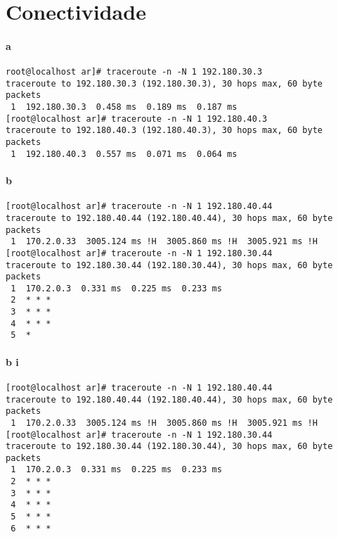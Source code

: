 \section{Conectividade}
\paragraph{a}
\begin{verbatim}
root@localhost ar]# traceroute -n -N 1 192.180.30.3
traceroute to 192.180.30.3 (192.180.30.3), 30 hops max, 60 byte packets
 1  192.180.30.3  0.458 ms  0.189 ms  0.187 ms
[root@localhost ar]# traceroute -n -N 1 192.180.40.3
traceroute to 192.180.40.3 (192.180.40.3), 30 hops max, 60 byte packets
 1  192.180.40.3  0.557 ms  0.071 ms  0.064 ms
\end{verbatim}

\paragraph{b}
\begin{verbatim}
[root@localhost ar]# traceroute -n -N 1 192.180.40.44                    
traceroute to 192.180.40.44 (192.180.40.44), 30 hops max, 60 byte packets
 1  170.2.0.33  3005.124 ms !H  3005.860 ms !H  3005.921 ms !H           
[root@localhost ar]# traceroute -n -N 1 192.180.30.44                    
traceroute to 192.180.30.44 (192.180.30.44), 30 hops max, 60 byte packets
 1  170.2.0.3  0.331 ms  0.225 ms  0.233 ms                              
 2  * * *                                                                
 3  * * *                                                                
 4  * * *                                                                
 5  *                                                                    
\end{verbatim}

\paragraph{b i}
\begin{verbatim}
[root@localhost ar]# traceroute -n -N 1 192.180.40.44                     
traceroute to 192.180.40.44 (192.180.40.44), 30 hops max, 60 byte packets 
 1  170.2.0.33  3005.124 ms !H  3005.860 ms !H  3005.921 ms !H            
[root@localhost ar]# traceroute -n -N 1 192.180.30.44                     
traceroute to 192.180.30.44 (192.180.30.44), 30 hops max, 60 byte packets 
 1  170.2.0.3  0.331 ms  0.225 ms  0.233 ms                               
 2  * * *                                                                 
 3  * * *                                                                 
 4  * * *                                                                 
 5  * * *                                                                 
 6  * * *                                                                 
\end{verbatim}
